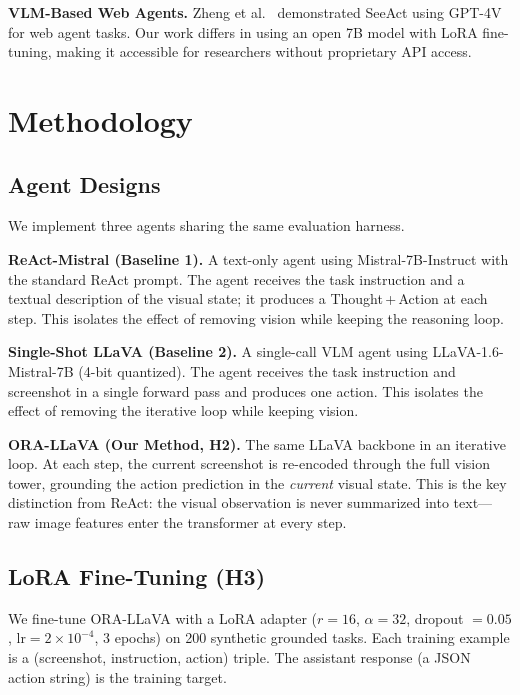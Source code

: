 \documentclass[10pt,twocolumn]{article}
\begin{document}
\textbf{VLM-Based Web Agents.}
Zheng et al.~\cite{zheng2024seeact} demonstrated SeeAct using GPT-4V for web agent tasks.
Our work differs in using an open 7B model with LoRA fine-tuning, making it accessible
for researchers without proprietary API access.

\section{Methodology}

\subsection{Agent Designs}

We implement three agents sharing the same evaluation harness.

\textbf{ReAct-Mistral (Baseline 1).}
A text-only agent using Mistral-7B-Instruct with the standard ReAct prompt. The agent receives
the task instruction and a textual description of the visual state; it produces a
Thought\,+\,Action at each step. This isolates the effect of removing vision while keeping the
reasoning loop.

\textbf{Single-Shot LLaVA (Baseline 2).}
A single-call VLM agent using LLaVA-1.6-Mistral-7B (4-bit quantized). The agent receives the
task instruction and screenshot in a single forward pass and produces one action. This isolates
the effect of removing the iterative loop while keeping vision.

\textbf{ORA-LLaVA (Our Method, H2).}
The same LLaVA backbone in an iterative loop. At each step, the current screenshot is
re-encoded through the full vision tower, grounding the action prediction in the \emph{current}
visual state. This is the key distinction from ReAct: the visual observation is never
summarized into text---raw image features enter the transformer at every step.

\subsection{LoRA Fine-Tuning (H3)}
\label{sec:lora}

We fine-tune ORA-LLaVA with a LoRA adapter ($r{=}16$, $\alpha{=}32$, dropout $= 0.05$,
$\text{lr} = 2{\times}10^{-4}$, 3 epochs) on 200 synthetic grounded tasks. Each training
example is a (screenshot, instruction, action) triple. The assistant response (a JSON action
string) is the training target.
\end{document}
